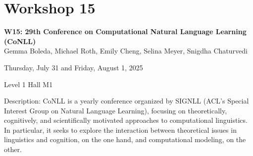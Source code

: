 \clearpage


\section[W15: 29th Conference on Computational Natural Language Learning (CoNLL)]{Workshop 15}
\label{workshop_15}

\begin{center}
    {\Large \textbf{W15: 29th Conference on Computational Natural Language Learning (CoNLL)}}\\

    Gemma Boleda, Michael Roth, Emily Cheng, Selina Meyer, Snigdha Chaturvedi
    
    Thursday, July 31 and Friday, August 1, 2025
    
    Level 1 Hall M1

\end{center}

Description: CoNLL is a yearly conference organized by SIGNLL (ACL's Special Interest Group on Natural Language Learning), focusing on theoretically, cognitively, and scientifically motivated approaches to computational linguistics.  In particular, it seeks to explore the interaction between theoretical issues in linguistics and cognition, on the one hand, and computational modeling, on the other.

